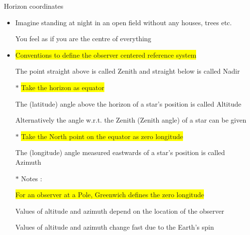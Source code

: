 \Tr
\begin{center}
{\red Horizon coordinates}
\end{center}
%
\begin{itemize}
\item Imagine standing at night in an open field without any houses, trees etc.
\item[] You feel as if you are the centre of everything
\item \colorbox{yellow}{Conventions to define the observer centered reference system}
\item[] The point straight above is called {\blue Zenith} and straight below is called {\blue Nadir}
\item[$\ast$] \colorbox{yellow}{Take the horizon as equator}
\item[] The (latitude) {\blue angle above the horizon} of a star's position is called {\blue Altitude}
\item[] Alternatively the angle w.r.t. the Zenith ({\blue Zenith angle}) of a star can be given
\item[$\ast$] \colorbox{yellow}{Take the North point on the equator as zero longitude}
\item[] The (longitude) {\blue angle measured eastwards} of a star's position is called {\blue Azimuth}
\item[$\ast$] Notes :
\item[] \colorbox{yellow}{For an observer at a Pole, Greenwich defines the zero longitude}
\item[] Values of altitude and azimuth depend on the location of the observer
\item[] Values of altitude and azimuth change fast due to the Earth's spin
\end{itemize}

